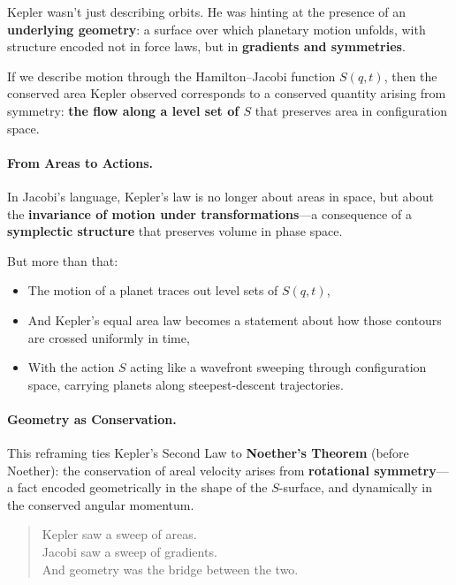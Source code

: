 Kepler wasn’t just describing orbits.  
He was hinting at the presence of an \textbf{underlying geometry}:  
a surface over which planetary motion unfolds, with structure encoded not in force laws,  
but in \textbf{gradients and symmetries}.

\bigskip

\begin{tcolorbox}[colback=blue!5!white, colframe=blue!80!black, title=\textbf{The Jacobi Interpretation of Kepler's Second Law}]
If we describe motion through the Hamilton–Jacobi function \( S(q,t) \),  
then the conserved area Kepler observed corresponds to a conserved quantity arising from symmetry:  
\textbf{the flow along a level set of \( S \)} that preserves area in configuration space.
\end{tcolorbox}

\bigskip

\paragraph{From Areas to Actions.}

In Jacobi's language, Kepler’s law is no longer about areas in space,  
but about the \textbf{invariance of motion under transformations}—a consequence of a \textbf{symplectic structure} that preserves volume in phase space.

But more than that:

\begin{itemize}
  \item The motion of a planet traces out level sets of \( S(q,t) \),
  \item And Kepler’s equal area law becomes a statement about how those contours are crossed uniformly in time,
  \item With the action \( S \) acting like a wavefront sweeping through configuration space,  
  carrying planets along steepest-descent trajectories.
\end{itemize}

\bigskip

\paragraph{Geometry as Conservation.}

This reframing ties Kepler’s Second Law to \textbf{Noether’s Theorem} (before Noether):  
the conservation of areal velocity arises from \textbf{rotational symmetry}—  
a fact encoded geometrically in the shape of the \( S \)-surface,  
and dynamically in the conserved angular momentum.

\bigskip

\begin{quote}
Kepler saw a sweep of areas.\\
Jacobi saw a sweep of gradients.\\
And geometry was the bridge between the two.
\end{quote}
